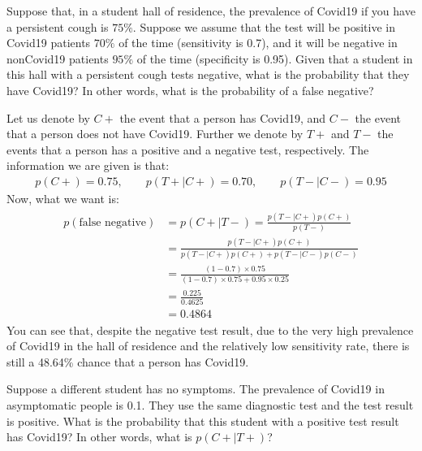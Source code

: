 \documentclass[letterpaper,10pt,english]{jupyterBook}
\begin{document}
\sphinxAtStartPar
Suppose that, in a student hall of residence, the prevalence of Covid\sphinxhyphen{}19 if you have a persistent cough is \(75\%\). Suppose we assume that the test will be positive in Covid\sphinxhyphen{}19 patients \(70\%\) of the time (sensitivity is 0.7), and it will be negative in non\sphinxhyphen{}Covid\sphinxhyphen{}19 patients \(95\%\) of the time (specificity is 0.95). Given that a student in this hall with a persistent cough tests negative, what is the probability that they have Covid\sphinxhyphen{}19? In other words, what is the probability of a false negative?

\sphinxAtStartPar
Let us denote by \(C+\) the event that a person has Covid\sphinxhyphen{}19, and \(C-\) the event that a person does not have Covid\sphinxhyphen{}19.  Further we denote by \(T+\) and \(T-\) the events that a person has a positive and a negative test, respectively. The information we are given is that:
\begin{equation*}
\begin{split}
p(C+)=0.75, \qquad p(T+|C+)=0.70, \qquad p(T-|C-)=0.95
\end{split}
\end{equation*}
\sphinxAtStartPar
Now, what we want is:
\begin{equation*}
\begin{split}
\begin{align}
p(\mbox{false negative}) &= p(C+|T-) = \frac{p(T-|C+)p(C+)}{p(T-)} \\
&= \frac{p(T-|C+)p(C+)}{p(T-|C+)p(C+) + p(T-|C-)p(C-)} \\
&= \frac{(1-0.7) \times 0.75}{(1-0.7) \times 0.75 + 0.95 \times 0.25} \\
&= \frac{0.225}{0.4625} \\
&= 0.4864
\end{align}
\end{split}
\end{equation*}
\sphinxAtStartPar
You can see that, despite the negative test result, due to the very high prevalence of Covid\sphinxhyphen{}19 in the hall of residence and the relatively low sensitivity rate, there is still a 48.64\% chance that a person has Covid\sphinxhyphen{}19.

\sphinxAtStartPar
Suppose a different student has no symptoms. The prevalence of Covid\sphinxhyphen{}19 in asymptomatic people is 0.1. They use the same diagnostic test and the test result is positive. What is the probability that this student with a positive test result has Covid\sphinxhyphen{}19? In other words, what is \(p(C+|T+)\)?
\end{document}
